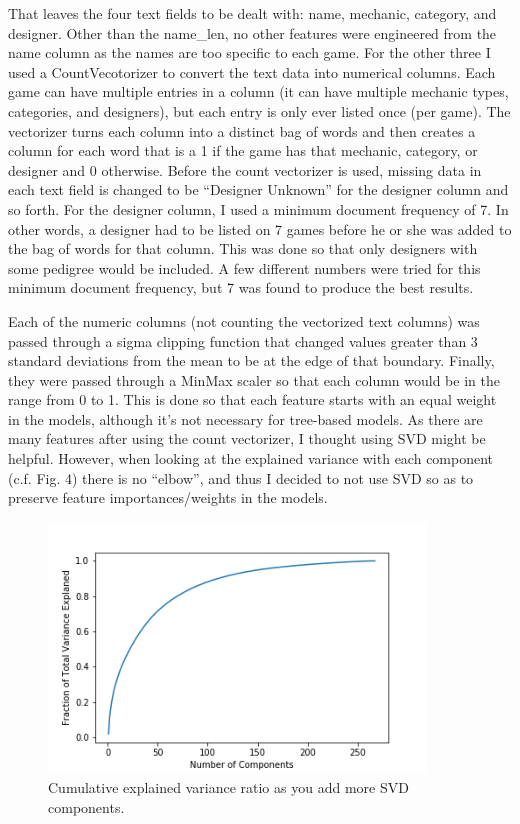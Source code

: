 \documentclass[12pt]{article}
\begin{document}
That leaves the four text fields to be dealt with: name, mechanic, category, and designer. Other than the name\_len, no other features were engineered from the name column as the names are too specific to each game. For the other three I used a CountVecotorizer to convert the text data into numerical columns. Each game can have multiple entries in a column (it can have multiple mechanic types, categories, and designers), but each entry is only ever listed once (per game).  The vectorizer turns each column into a distinct bag of words and then creates a column for each word that is a 1 if the game has that mechanic, category, or designer and 0 otherwise. Before the count vectorizer is used, missing data in each text field is changed to be ``Designer Unknown'' for the designer column and so forth. For the designer column, I used a minimum document frequency of 7. In other words, a designer had to be listed on 7 games before he or she was added to the bag of words for that column. This was done so that only designers with some pedigree would be included. A few different numbers were tried for this minimum document frequency, but 7 was found to produce the best results.

Each of the numeric columns (not counting the vectorized text columns) was passed through a sigma clipping function that changed values greater than 3 standard deviations from the mean to be at the edge of that boundary. Finally, they were passed through a MinMax scaler so that each column would be in the range from 0 to 1. This is done so that each feature starts with an equal weight in the models, although it's not necessary for tree-based models. As there are many features after using the count vectorizer, I thought using SVD might be helpful. However, when looking at the explained variance with each component (c.f. Fig. 4) there is no ``elbow'', and thus I decided to not use SVD so as to preserve feature importances/weights in the models.

\begin{figure}[ht]
\centering
\includegraphics[width=10cm]{market_svd.png}
\caption{\small Cumulative explained variance ratio as you add more SVD components.}
\end{figure}
\end{document}

